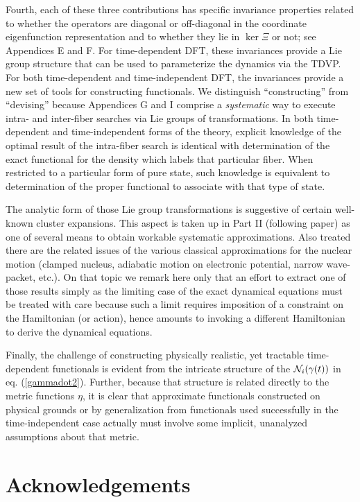 Fourth, each of these three contributions has specific invariance properties
related to whether the operators are diagonal or off-diagonal in the
coordinate eigenfunction representation and to whether they lie in $\ker \Xi 
$ or not; see Appendices E and F. For time-dependent DFT, these invariances
provide a Lie group structure that can be used to parameterize the dynamics
via the TDVP. For both time-dependent and time-independent DFT, the
invariances provide a new set of tools for constructing functionals. We
distinguish ``constructing'' from ``devising'' because Appendices G and I
comprise a {\em systematic} way to execute intra- and inter-fiber searches
via Lie groups of transformations. In both time-dependent and
time-independent forms of the theory, explicit knowledge of the optimal
result of the intra-fiber search is identical with determination of the
exact functional for the density which labels that particular fiber. When
restricted to a particular form of pure state, such knowledge is equivalent
to determination of the proper functional to associate with that type of
state.

The analytic form of those Lie group transformations is suggestive of
certain well-known cluster expansions.\cite{Blaizot86} This aspect is taken
up in Part II (following paper) as one of several means to obtain workable
systematic approximations. Also treated there are the related issues of the
various classical approximations for the nuclear motion (clamped nucleus,
adiabatic motion on electronic potential, narrow wave-packet, etc.). On that
topic we remark here only that an effort to extract one of those results
simply as the limiting case of the exact dynamical equations must be treated
with care because such a limit requires imposition of a constraint on the
Hamiltonian (or action), hence amounts to invoking a different Hamiltonian
to derive the dynamical equations.

Finally, the challenge of constructing physically realistic, yet tractable
time-dependent functionals is evident from the intricate structure of the $%
{\cal N}_{i} (\gamma (t))$ in eq. (\ref{gammadot2}). Further, because that
structure is related directly to the metric functions $\eta$, it is clear
that approximate functionals constructed on physical grounds or by
generalization from functionals used successfully in the time-independent
case actually must involve some implicit, unanalyzed assumptions about that
metric.

\section{Acknowledgements}


